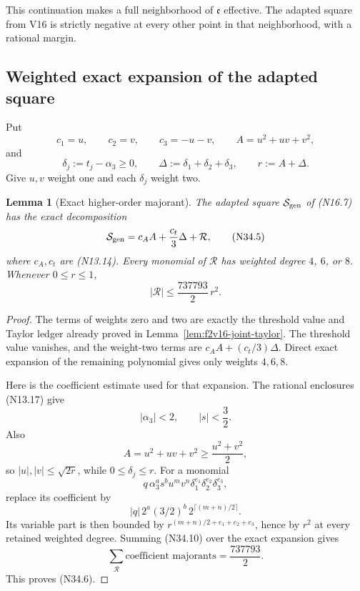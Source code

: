 \documentclass[11pt]{article}
\newtheorem{lemma}[theorem]{Lemma}
\theoremstyle{definition}
\theoremstyle{remark}
\begin{document}
This continuation makes a full neighborhood of \(\mathfrak e\) effective.
The adapted square from V16 is strictly negative at every other point in
that neighborhood, with a rational margin.

\subsection{Weighted exact expansion of the adapted square}

Put
\[
 c_1=u,\qquad c_2=v,\qquad c_3=-u-v,\qquad
 A=u^2+uv+v^2,
 \tag{N34.3}
\]
and
\[
 \delta_j:=t_j-\alpha_3\geq0,\qquad
 \Delta:=\delta_1+\delta_2+\delta_3,\qquad
 r:=A+\Delta.
 \tag{N34.4}
\]
Give \(u,v\) weight one and each \(\delta_j\) weight two.

\begin{lemma}[Exact higher-order majorant]
\label{lem:f2v34-remainder}
The adapted square \(\mathcal S_{\rm gen}\) of \textup{(N16.7)} has
the exact decomposition
\[
 \mathcal S_{\rm gen}
 =c_AA+\frac{c_t}{3}\Delta+\mathcal R,
 \tag{N34.5}
\]
where \(c_A,c_t\) are \textup{(N13.14)}.  Every monomial of
\(\mathcal R\) has weighted degree \(4\), \(6\), or \(8\).  Whenever
\(0\leq r\leq1\),
\[
 \boxed{|\mathcal R|\leq\frac{737793}{2}\,r^2.}
 \tag{N34.6}
\]
\end{lemma}

\begin{proof}
The terms of weights zero and two are exactly the threshold value and
Taylor ledger already proved in Lemma~\ref{lem:f2v16-joint-taylor}.
The threshold value vanishes, and the weight-two terms are
\(c_AA+(c_t/3)\Delta\).  Direct exact expansion of the remaining
polynomial gives only weights \(4,6,8\).

Here is the coefficient estimate used for that expansion.  The rational
enclosures \textup{(N13.17)} give
\[
 |\alpha_3|<2,\qquad |s|<\frac32.
 \tag{N34.7}
\]
Also
\[
 A=u^2+uv+v^2\geq\frac{u^2+v^2}{2},
 \tag{N34.8}
\]
so \(|u|,|v|\leq\sqrt{2r}\), while
\(0\leq\delta_j\leq r\).  For a monomial
\[
 q\,\alpha_3^a s^b u^m v^n
 \delta_1^{e_1}\delta_2^{e_2}\delta_3^{e_3},
 \tag{N34.9}
\]
replace its coefficient by
\[
 |q|\,2^a(3/2)^b\,2^{\lceil(m+n)/2\rceil}.
 \tag{N34.10}
\]
Its variable part is then bounded by
\(r^{(m+n)/2+e_1+e_2+e_3}\), hence by \(r^2\) at every retained
weighted degree.  Summing \textup{(N34.10)} over the exact expansion
gives
\[
 \sum_{\mathcal R}\text{coefficient majorants}
 =\frac{737793}{2}.
 \tag{N34.11}
\]
This proves \textup{(N34.6)}.
\end{proof}
\end{document}
